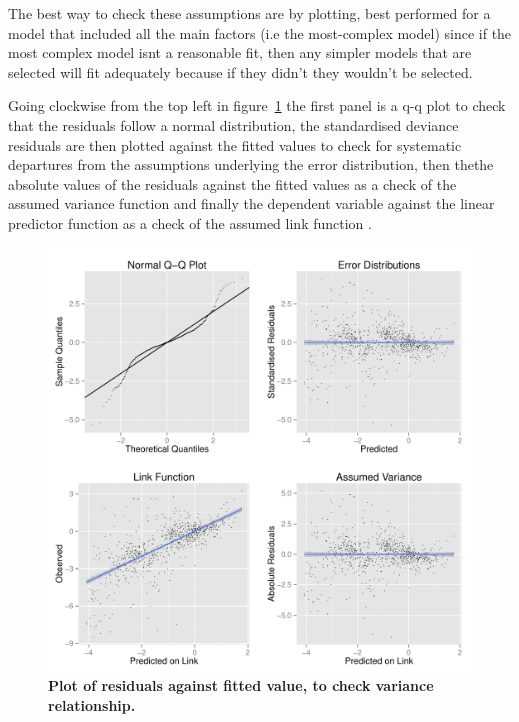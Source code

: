 \documentclass[shortnames,nojss,article]{jss}
\begin{document}
The best way to check these assumptions are by plotting, best
performed for a model that included all the main factors (i.e the most-complex model) since if the most
complex model isnt a reasonable fit, then any simpler models that are selected will fit adequately because if they
didn't they wouldn't be selected. 

Going clockwise from the top left in figure~\ref{glm} the first panel is a q-q plot to check that the residuals
follow a normal distribution, the standardised deviance residuals are then plotted against the fitted values to check for
systematic departures from the assumptions underlying the error distribution, then thethe absolute values of the
residuals against the fitted values as a check of the assumed variance function and finally the dependent variable
against the linear predictor function as a check of the assumed link function \cite{ortiz2004alternative}.


\begin{figure}\begin{center}
\includegraphics{diags-023}
\caption{\bf{Plot of residuals against fitted value, to check variance relationship.}}
\label{glm}
\end{center}\end{figure}


\newpage
 

\end{document}
